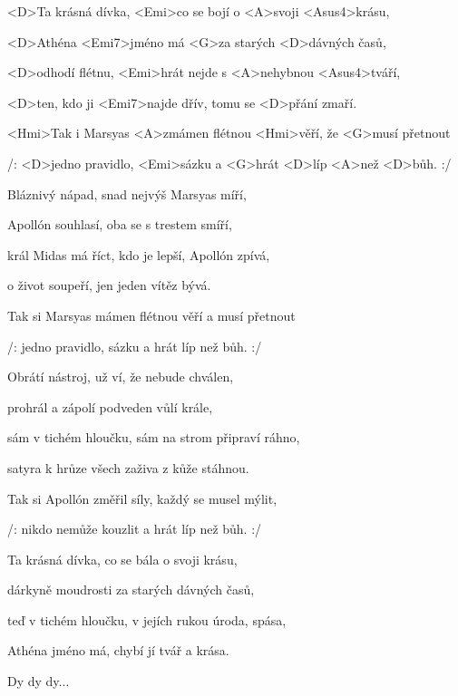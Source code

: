 

\zs
<D>Ta krásná dívka, <Emi>co se bojí o <A>svoji <Asus4>krásu,

<D>Athéna <Emi7>jméno má <G>za starých <D>dávných časů,

<D>odhodí flétnu, <Emi>hrát nejde s <A>nehybnou <Asus4>tváří,

<D>ten, kdo ji <Emi7>najde dřív, tomu se <D>přání zmaří.
\ks

\zr
<Hmi>Tak i Marsyas <A>zmámen flétnou <Hmi>věří, že <G>musí přetnout

/: <D>jedno pravidlo, <Emi>sázku a <G>hrát <D>líp <A>než <D>bůh. :/
\kr

\zs
Bláznivý nápad, snad nejvýš Marsyas míří,

Apollón souhlasí, oba se s trestem smíří,

král Midas má říct, kdo je lepší, Apollón zpívá,

o život soupeří, jen jeden vítěz bývá.
\ks

\zr
Tak si Marsyas mámen flétnou věří a musí přetnout

/: jedno pravidlo, sázku a hrát líp než bůh. :/
\kr

\zs
Obrátí nástroj, už ví, že nebude chválen,

prohrál a zápolí podveden vůlí krále,

sám v tichém hloučku, sám na strom připraví ráhno,

satyra k hrůze všech zaživa z kůže stáhnou.
\ks

\zr
Tak si Apollón změřil síly, každý se musel mýlit,

/: nikdo nemůže kouzlit a hrát líp než bůh. :/
\kr

\zs
Ta krásná dívka, co se bála o svoji krásu,

dárkyně moudrosti za starých dávných časů,

teď v tichém hloučku, v jejích rukou úroda, spása,

Athéna jméno má, chybí jí tvář a krása.
\ks

\zr
Dy dy dy...
\kr

\kp
